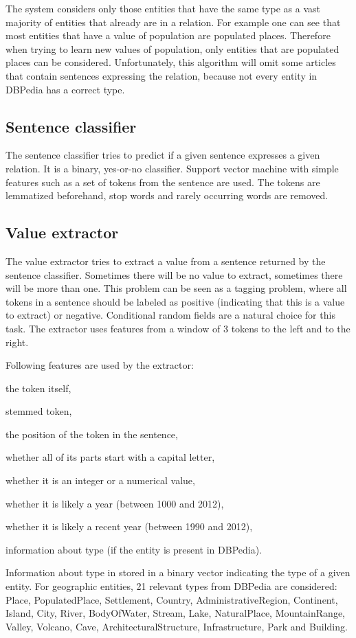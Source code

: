 \documentclass[10pt,a5paper,twoside]{article}
\begin{document}
The system considers only those entities that have the same type as a vast majority of entities that already are in a relation. For example one can see that most entities that have a value of population are populated places. Therefore when trying to learn new values of population, only entities that are populated places can be considered. Unfortunately, this algorithm will omit some articles that contain sentences expressing the relation, because not every entity in DBPedia has a correct type.

\subsection{Sentence classifier}
The sentence classifier tries to predict if a given sentence expresses a given relation. It is a binary, yes-or-no classifier.
Support vector machine with simple features such as a set of tokens from the sentence are used. The tokens are lemmatized beforehand, stop words and rarely occurring words are removed.

\subsection{Value extractor}
The value extractor tries to extract a value from a sentence returned by the sentence classifier. Sometimes there will be no value to extract, sometimes there will be more than one. This problem can be seen as a tagging problem, where all tokens in a sentence should be labeled as positive (indicating that this is a value to extract) or negative. Conditional random fields are a natural choice for this task. The extractor uses features from a window of 3 tokens to the left and to the right. 

Following features are used by the extractor:
\begin{compactitem}
    \item the token itself,
    \item stemmed token,
    \item the position of the token in the sentence,
    \item whether all of its parts start with a capital letter,
    \item whether it is an integer or a numerical value,
    \item whether it is likely a year (between 1000 and 2012),
    \item whether it is likely a recent year (between 1990 and 2012),
    \item information about type (if the entity is present in DBPedia).
\end{compactitem}
Information about type in stored in a binary vector indicating the type of a given entity. For geographic entities, 21 relevant types from DBPedia are considered: Place, PopulatedPlace, Settlement, Country, AdministrativeRegion, Continent, Island, City, River, BodyOfWater, Stream, Lake, NaturalPlace, MountainRange, Valley, Volcano, Cave, ArchitecturalStructure, Infrastructure, Park and Building.
\end{document}
